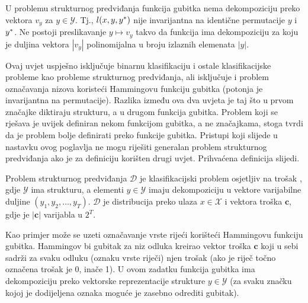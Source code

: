 \begin{condition}\label{uvjet2}

  U problemu strukturnog predviđanja funkcija gubitka nema dekompoziciju preko
  vektora $v_y$ za $y \in \mathcal{Y}$. Tj., $l(x, y, y\ssymbol{1})$ nije
  invarijantna na identične permutacije $y$ i $y\ssymbol{1}$. Ne postoji
  preslikavanje $y \mapsto v_y$ takvo da funkcija ima dekompoziciju za koju je
  duljina vektora $|v_y|$ polinomijalna u broju izlaznih elemenata $|y|$.

\end{condition}

\noindent
Ovaj uvjet uspješno isključuje binarnu klasifikaciju i ostale klasifikacijske
probleme kao probleme strukturnog predviđanja, ali isključuje i problem
označavanja nizova koristeći Hammingovu funkciju gubitka (potonja je
invarijantna na permutacije). Razlika između ova dva uvjeta je taj što u prvom
značajke diktiraju strukturu, a u drugom funkcija gubitka. Problem koji se
rješava je uvijek definiran nekom funkcijom gubitka, a ne značajkama, stoga
\citeauthor{daume06thesis} tvrdi da je problem bolje definirati preko funkcije
gubitka. Pristupi koji slijede u nastavku ovog poglavlja ne mogu riješiti
generalan problem strukturnog predviđanja ako je za definiciju korišten drugi
uvjet. Prihvaćena definicija slijedi.

\begin{definition} \label{def:jointlearn}

  Problem strukturnog predviđanja $\mathcal{D}$ je klasifikacijski problem
  osjetljiv na trošak , gdje
  $\mathcal{Y}$ ima strukturu, a elementi $y \in \mathcal{Y}$ imaju
  dekompoziciju u vektore varijabilne duljine $(y_1, y_2, \ldots, y_T)$.
  $\mathcal{D}$ je distribucija preko ulaza $x \in \mathcal{X}$ i vektora troška
  $\mathbf{c}$, gdje je $|\mathbf{c}|$ varijabla u $2^T$.

\end{definition}

\noindent
Kao primjer može se uzeti označavanje vrste rijeći korišteći Hammingovu funkciju
gubitka. Hammingov bi gubitak za niz odluka kreirao vektor troška $\mathbf{c}$
koji u sebi sadrži za svaku odluku (oznaku vrste riječi) njen trošak (ako je
riječ točno označena trošak je 0, inače 1). U ovom zadatku funkcija gubitka ima
dekompoziciju preko vektorske reprezentacije strukture $y \in \mathcal{Y}$ (za
svaku značku kojoj je dodijeljena oznaka moguće je zasebno odrediti gubitak).


